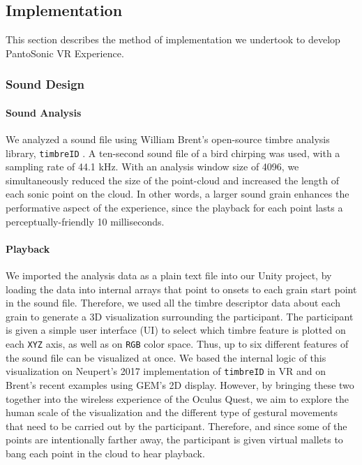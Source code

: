 \documentclass{nime-alternate}
\begin{document}
\subsection{Implementation}

This section describes the method of implementation we undertook to develop PantoSonic VR Experience.

\subsubsection{Sound Design}

\paragraph{Sound Analysis} We analyzed a sound file using William Brent's open-source timbre analysis library, \texttt{timbreID} \cite{icmc/bbp2372.2010.044}. A ten-second sound file of a bird chirping was used, with a sampling rate of 44.1 kHz. With an analysis window size of 4096, we simultaneously reduced the size of the point-cloud and increased the length of each sonic point on the cloud. In other words, a larger sound grain enhances the performative aspect of the experience, since the playback for each point lasts a perceptually-friendly 10 milliseconds.

\paragraph{Playback}
We imported the analysis data as a plain text file into our Unity project, by loading the data into internal arrays that point to onsets to each grain start point in the sound file. Therefore, we used all the timbre descriptor data about each grain to generate a 3D visualization surrounding the participant. The participant is given a simple user interface (UI) to select which timbre feature is plotted on each \texttt{XYZ} axis, as well as on \texttt{RGB} color space. Thus, up to six different features of the sound file can be visualized at once. We based the internal logic of this visualization on Neupert's 2017 implementation of \texttt{timbreID} in VR and on Brent's recent examples using GEM's 2D display. However, by bringing these two together into the wireless experience of the Oculus Quest, we aim to explore the human scale of the visualization and the different type of gestural movements that need to be carried out by the participant. Therefore, and since some of the points are intentionally farther away, the participant is given virtual mallets to bang each point in the cloud to hear playback.
\end{document}
